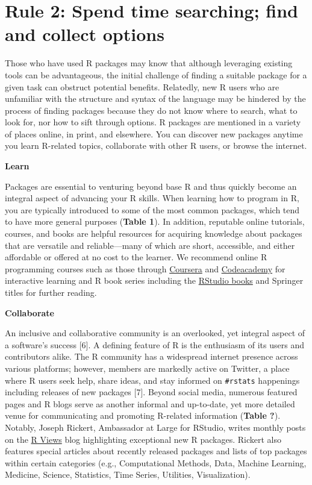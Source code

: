 \documentclass[10pt,letterpaper]{article}
\begin{document}
\hypertarget{rule-2-spend-time-searching-find-and-collect-options}{%
\section{Rule 2: Spend time searching; find and collect
options}\label{rule-2-spend-time-searching-find-and-collect-options}}

Those who have used R packages may know that although leveraging
existing tools can be advantageous, the initial challenge of finding a
suitable package for a given task can obstruct potential benefits.
Relatedly, new R users who are unfamiliar with the structure and syntax
of the language may be hindered by the process of finding packages
because they do not know where to search, what to look for, nor how to
sift through options. R packages are mentioned in a variety of places
online, in print, and elsewhere. You can discover new packages anytime
you learn R-related topics, collaborate with other R users, or browse
the internet.

\textbf{Learn}

Packages are essential to venturing beyond base R and thus quickly
become an integral aspect of advancing your R skills. When learning how
to program in R, you are typically introduced to some of the most common
packages, which tend to have more general purposes (\textbf{Table 1}).
In addition, reputable online tutorials, courses, and books are helpful
resources for acquiring knowledge about packages that are versatile and
reliable---many of which are short, accessible, and either affordable or
offered at no cost to the learner. We recommend online R programming
courses such as those through
\href{https://www.coursera.org/learn/r-programming}{Coursera} and
\href{https://www.codecademy.com/learn/learn-r}{Codeacademy} for
interactive learning and R book series including the
\href{https://rstudio.com/resources/books/}{RStudio books} and Springer
titles for further reading.

\textbf{Collaborate}

An inclusive and collaborative community is an overlooked, yet integral
aspect of a software's success {[}6{]}. A defining feature of R is the
enthusiasm of its users and contributors alike. The R community has a
widespread internet presence across various platforms; however, members
are markedly active on Twitter, a place where R users seek help, share
ideas, and stay informed on \texttt{\#rstats} happenings including
releases of new packages {[}7{]}. Beyond social media, numerous featured
pages and R blogs serve as another informal and up-to-date, yet more
detailed venue for communicating and promoting R-related information
(\textbf{Table ?}). Notably, Joseph Rickert, Ambassador at Large for
RStudio, writes monthly posts on the
\href{https://rviews.rstudio.com/}{R Views} blog highlighting
exceptional new R packages. Rickert also features special articles about
recently released packages and lists of top packages within certain
categories (e.g., Computational Methods, Data, Machine Learning,
Medicine, Science, Statistics, Time Series, Utilities, Visualization).
\end{document}
